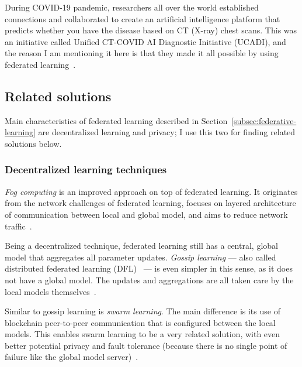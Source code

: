 During COVID-19 pandemic, researchers all over the world established connections and collaborated to create an artificial intelligence platform that predicts whether you have the disease based on CT (X-ray) chest scans. This was an initiative called Unified CT-COVID AI Diagnostic Initiative (UCADI), and the reason I am mentioning it here is that they made it all possible by using federated learning~\cite{mammenFederatedLearningOpportunities2021a, baiAdvancingCOVID19Diagnosis2021}.


\subsection{Related solutions}

Main characteristics of federated learning described in Section~\ref{subsec:federative-learning} are decentralized learning and privacy; I use this two for finding related solutions below.

\subsubsection{Decentralized learning techniques}

\emph{Fog computing} is an improved approach on top of federated learning. It originates from the network challenges of federated learning,  focuses on layered architecture of communication between local and global model, and aims to reduce network traffic~\cite{gorrichoMASTERSDEGREETELECOMMUNICATIONS}.

Being a decentralized technique, federated learning still has a central, global model that aggregates all parameter updates. \emph{Gossip learning} --- also called distributed federated learning (DFL)~\cite{shammarSwarmLearningSurvey2025} --- is even simpler in this sense, as it does not have a global model. The updates and aggregations are all taken care by the local models themselves~\cite{hegedusDecentralizedLearningWorks2021b}.

Similar to gossip learning is \emph{swarm learning}. The main difference is its use of blockchain peer-to-peer communication that is configured between the local models. This enables swarm learning to be a very related solution, with even better potential privacy and fault tolerance (because there is no single point of failure like the global model server)~\cite{shammarSwarmLearningSurvey2025}.

